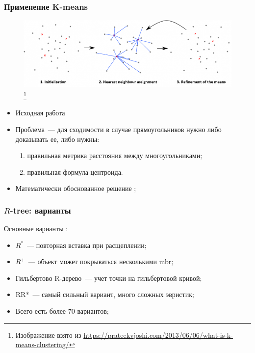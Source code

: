 \documentclass{beamer}
\begin{document}
\begin{frame}
\frametitle{Применение K-means}

  \begin{figure}[htb]
  \includegraphics[width=\textwidth,height=0.4\textheight,keepaspectratio]{steps-of-kmeans.png} 
  \footnote{\tiny{Изображение взято из \url{https://prateekvjoshi.com/2013/06/06/what-is-k-means-clustering/}}}
  \end{figure}   

\begin{itemize}
  \item Исходная работа \cite{Brakatsoulas2002}
  \item Проблема~--- для сходимости в случае прямоугольников нужно либо доказывать ее, либо нужны: 
  \begin{enumerate}
    \item правильная метрика расстояния между многоугольниками;
    \item правильная формула центроида.
  \end{enumerate}
  \item Математически обоснованное решение \cite{Grigorev2016};
\end{itemize}

\end{frame}

\begin{frame}
\frametitle{$R$-tree: варианты}

Основные варианты \cite{Papadopoulos2009}:

\begin{itemize}
  \setlength\itemsep{1em}
  \item $R^*$~--- повторная вставка при расщеплении;
  \item $R^+$~--- объект может покрываться несколькими mbr;
  \item Гильбертово R-дерево~--- учет точки на гильбертовой кривой;
  \item RR*~--- самый сильный вариант, много сложных эвристик;
  \item Всего есть более 70 вариантов;
\end{itemize}

\end{frame}
\end{document}
